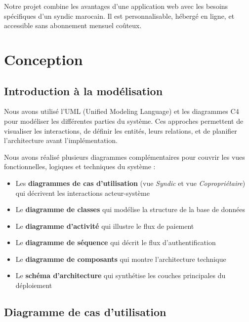 \documentclass[12pt, a4paper]{report}
\begin{document}
\vspace{0.5em}

Notre projet combine les avantages d'une application web avec les besoins spécifiques d'un syndic marocain. Il est personnalisable, hébergé en ligne, et accessible sans abonnement mensuel coûteux.

\chapter{Conception}

\section{Introduction à la modélisation}

Nous avons utilisé l'UML (Unified Modeling Language) et les diagrammes C4 pour modéliser les différentes parties du système. Ces approches permettent de visualiser les interactions, de définir les entités, leurs relations, et de planifier l'architecture avant l'implémentation.

Nous avons réalisé plusieurs diagrammes complémentaires pour couvrir les vues fonctionnelles, logiques et techniques du système :
\begin{itemize}
  \item Les \textbf{diagrammes de cas d'utilisation} (vue \textit{Syndic} et vue \textit{Copropriétaire}) qui décrivent les interactions acteur-système
  \item Le \textbf{diagramme de classes} qui modélise la structure de la base de données
  \item Le \textbf{diagramme d'activité} qui illustre le flux de paiement
  \item Le \textbf{diagramme de séquence} qui décrit le flux d'authentification
  \item Le \textbf{diagramme de composants} qui montre l'architecture technique
  \item Le \textbf{schéma d'architecture} qui synthétise les couches principales du déploiement
\end{itemize}

\section{Diagramme de cas d'utilisation}
\end{document}
